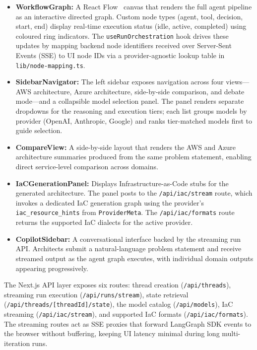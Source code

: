 \begin{itemize}
    \item \textbf{WorkflowGraph:} A React Flow~\cite{reactflow2024} canvas that renders the full agent pipeline as an interactive directed graph. Custom node types (agent, tool, decision, start, end) display real-time execution status (idle, active, completed) using coloured ring indicators. The \texttt{useRunOrchestration} hook drives these updates by mapping backend node identifiers received over Server-Sent Events (SSE) to UI node IDs via a provider-agnostic lookup table in \texttt{lib/node-mapping.ts}.
    \item \textbf{SidebarNavigator:} The left sidebar exposes navigation across four views---AWS architecture, Azure architecture, side-by-side comparison, and debate mode---and a collapsible model selection panel. The panel renders separate dropdowns for the reasoning and execution tiers; each list groups models by provider (OpenAI, Anthropic, Google) and ranks tier-matched models first to guide selection.
    \item \textbf{CompareView:} A side-by-side layout that renders the AWS and Azure architecture summaries produced from the same problem statement, enabling direct service-level comparison across domains.
    \item \textbf{IaCGenerationPanel:} Displays Infrastructure-as-Code stubs for the generated architecture. The panel posts to the \texttt{/api/iac/stream} route, which invokes a dedicated IaC generation graph using the provider's \texttt{iac\_resource\_hints} from \texttt{ProviderMeta}. The \texttt{/api/iac/formats} route returns the supported IaC dialects for the active provider.
    \item \textbf{CopilotSidebar:} A conversational interface backed by the streaming run API. Architects submit a natural-language problem statement and receive streamed output as the agent graph executes, with individual domain outputs appearing progressively.
\end{itemize}

The Next.js API layer exposes six routes: thread creation (\texttt{/api/threads}), streaming run execution (\texttt{/api/runs/stream}), state retrieval (\texttt{/api/threads/[threadId]/state}), the model catalog (\texttt{/api/models}), IaC streaming (\texttt{/api/iac/stream}), and supported IaC formats (\texttt{/api/iac/formats}). The streaming routes act as SSE proxies that forward LangGraph SDK events to the browser without buffering, keeping UI latency minimal during long multi-iteration runs.

